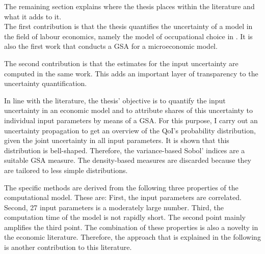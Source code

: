 The remaining section explains where the thesis places within the literature and what it adds to it.\\
\newline
The first contribution is that the thesis quantifies the uncertainty of a model in the field of labour economics, namely the model of occupational choice in \cite{Keane.1994}. It is also the first work that conducts a GSA for a microeconomic model.

The second contribution is that the estimates for the input uncertainty are computed in the same work. This adds an important layer of transparency to the uncertainty quantification.

In line with the literature, the thesis' objective is to quantify the input uncertainty in an economic model and to attribute shares of this uncertainty to individual input parameters by means of a GSA. For this purpose, I carry out an uncertainty propagation to get an overview of the QoI's probability distribution, given the joint uncertainty in all input parameters. It is shown that this distribution is bell-shaped. Therefore, the variance-based Sobol' indices are a suitable GSA measure. The density-based measures are discarded because they are tailored to less simple distributions.

The specific methods are derived from the following three properties of the computational model. These are: First, the input parameters are correlated. Second, 27 input parameters is a moderately large number. Third, the computation time of the model is not rapidly short. The second point mainly amplifies the third point. The combination of these properties is also a novelty in the economic literature. Therefore, the approach that is explained in the following is another contribution to this literature.

